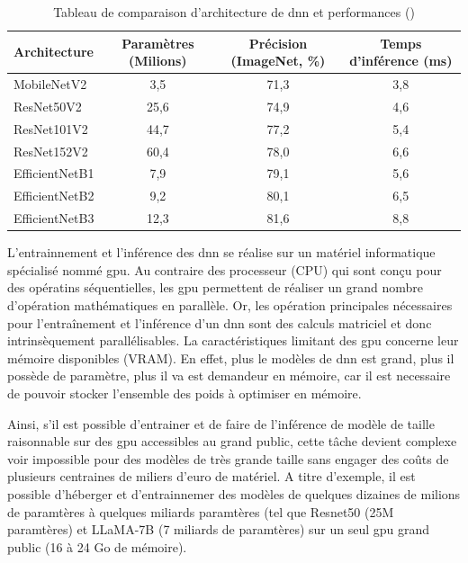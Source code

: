 \begin{table}[!htbp]
\centering
\begin{tabular}{|l|c|c|c|} 
 \hline
 Architecture & Paramètres (Milions) & Précision (ImageNet, \%)  & Temps d'inférence (ms) \\
 \hline
MobileNetV2 & 3,5 & 71,3 & 3,8 \\
\hline
ResNet50V2 & 25,6 & 74,9 & 4,6 \\ 
ResNet101V2 & 44,7 & 77,2 & 5,4 \\ 
ResNet152V2 & 60,4 & 78,0 & 6,6 \\
\hline
EfficientNetB1 & 7,9 & 79,1 & 5,6 \\
EfficientNetB2 & 9,2 & 80,1& 6,5 \\
EfficientNetB3 & 12,3 & 81,6 & 8,8 \\
 \hline
\end{tabular}
\caption{Tableau de comparaison d'architecture de \gls{dnn} et performances (\cite{chollet_keras_2023})}
\label{table:dnn-size}
\end{table}

L'entrainnement et l'inférence des \gls{dnn} se réalise sur un matériel informatique spécialisé nommé \gls{gpu}. Au contraire des processeur (CPU) qui sont conçu pour des opératins séquentielles, les \gls{gpu} permettent de réaliser un grand nombre d'opération mathématiques en parallèle. Or, les opération principales nécessaires pour l'entraînement et l'inférence d'un \gls{dnn} sont des calculs matriciel et donc intrinsèquement parallélisables. La caractéristiques limitant des \gls{gpu} concerne leur mémoire disponibles (VRAM). En effet, plus le modèles de \gls{dnn} est grand, plus il possède de paramètre, plus il va est demandeur en mémoire, car il est necessaire de pouvoir stocker l'ensemble des poids à optimiser en mémoire. 

Ainsi, s'il est possible d'entrainer et de faire de l'inférence de modèle de taille raisonnable sur des \gls{gpu} accessibles au grand public, cette tâche devient complexe voir impossible pour des modèles de très grande taille sans engager des coûts de plusieurs centraines de miliers d'euro de matériel. A titre d'exemple, il est possible d'héberger et d'entrainnemer des modèles de quelques dizaines de milions de paramtères à quelques miliards paramtères (tel que Resnet50 (25M paramtères) et LLaMA-7B (7 miliards de paramtères) sur un seul \gls{gpu} grand public (16 à 24 Go de mémoire). 


